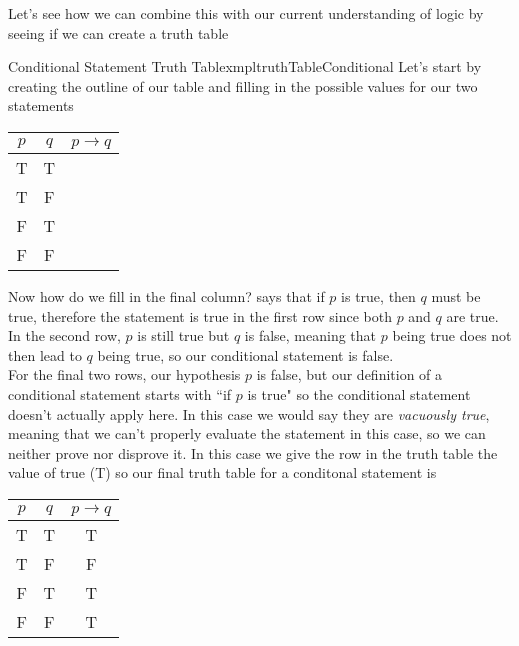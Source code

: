 Let's see how we can combine this with our current understanding of logic by seeing if we can create a truth table

\newpage
\begin{exmpl}[label={exmpl:truthTableConditional}]{Conditional Statement Truth Table}{xmpltruthTableConditional}
    Let's start by creating the outline of our table and filling in the possible values for our two statements
    \begin{center}
        \begin{tabular}{|c|c|c|}
            \hline
            $p$ & $q$ & $p \to q$ \\
            \hline
            T   & T   &           \\
            \hline
            T   & F   &           \\
            \hline
            F   & T   &           \\
            \hline
            F   & F   &           \\
            \hline
        \end{tabular}
    \end{center}

    Now how do we fill in the final column?  says that if $p$ is true, then $q$ must be true, therefore the statement is true in the first row since both $p$ and $q$ are true.\\

    In the second row, $p$ is still true but $q$ is false, meaning that $p$ being true does not then lead to $q$ being true, so our conditional statement is false.\\

    For the final two rows, our hypothesis $p$ is false, but our definition of a conditional statement starts with ``if $p$ is true" so the conditional statement doesn't actually apply here. In this case we would say they are \emph{vacuously true}, meaning that we can't properly evaluate the statement in this case, so we can neither prove nor disprove it. In this case we give the row in the truth table the value of true (T) so our final truth table for a conditonal statement is

    \begin{center}
        \begin{tabular}{|c|c|c|}
            \hline
            $p$ & $q$ & $p \to q$ \\
            \hline
            T   & T   & T         \\
            \hline
            T   & F   & F         \\
            \hline
            F   & T   & T         \\
            \hline
            F   & F   & T         \\
            \hline
        \end{tabular}
    \end{center}


\end{exmpl}
